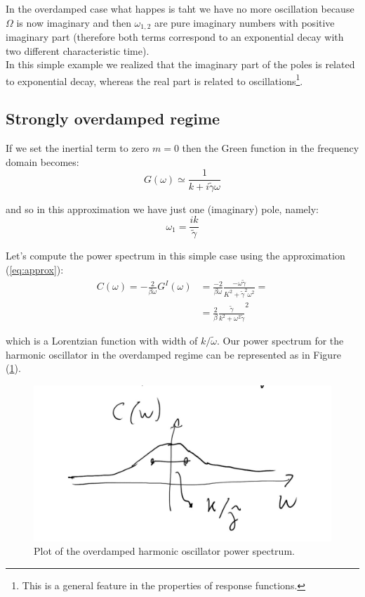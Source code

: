 \documentclass[\main/main.tex]{subfiles}
\begin{document}
In the overdamped case what happes is taht we have no more oscillation because $\Omega$ is now imaginary and then $\omega_{1,2}$ are pure imaginary numbers with positive imaginary part (therefore both terms correspond to an exponential decay with two different characteristic time). \\

In this simple example we realized that the imaginary part of the poles is related to exponential decay, whereas the real part is related to oscillations\footnote{This is a general feature in the properties of response functions.}.

\subsection{Strongly overdamped regime}

If we set the inertial term to zero $m=0$ then the Green function in the frequency domain becomes:
\begin{equation}
    G(\omega)\simeq \frac{1}{k+i\tilde{\gamma}\omega}
    \label{eq:approx}
\end{equation}

and so in this approximation we have just one (imaginary) pole, namely:
\begin{equation*}
    \omega_1=\frac{i k}{\tilde{\gamma}}
\end{equation*}


Let's compute the power spectrum in this simple case  using the approximation (\ref{eq:approx}):
\begin{eqnarray}
C(\omega)=-\frac{2}{\beta \omega} G^{I}(\omega) &=\frac{-2}{\beta\omega} \frac{-\omega \tilde{\gamma}}{K^{2}+\tilde{\gamma}^{2} \omega^{2}}= \\
&=\frac{2}{\beta}\frac{\tilde{\gamma}}{k^2+\omega^2\tilde{\gamma}}^2
\end{eqnarray}

which is a Lorentzian function with width of $k/\tilde{\omega}$. Our power spectrum for the harmonic oscillator in the overdamped regime can be represented as in Figure (\ref{fig:foto}).

\begin{figure}[ht]
    \centering
    \includegraphics[width=0.5\linewidth]{Lectures/Images/od.jpg}
    \caption{Plot of the overdamped harmonic oscillator power spectrum.}
    \label{fig:foto}
\end{figure}
\end{document}
